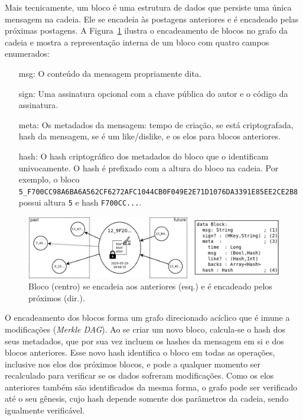 \documentclass[12pt]{article}
\begin{document}
Mais tecnicamente, um bloco é uma estrutura de dados que persiste uma única
mensagem na cadeia.
Ele se encadeia às postagens anteriores e é encadeado pelas próximas postagens.
A Figura~\ref{fig.block} ilustra o encadeamento de blocos no grafo da cadeia e
mostra a representação interna de um bloco com quatro campos enumerados:
%
\begin{enumerate}
\item[msg:]  O conteúdo da mensagem propriamente dita.
\item[sign:] Uma assinatura opcional com a chave pública do autor e o código da
             assinatura.
\item[meta:] Os metadados da mensagem: tempo de criação, se está criptografada,
             hash da mensagem, se é um like/dislike, e os elos para blocos
             anteriores.
\item[hash:] O hash criptográfico dos metadados do bloco que o identificam
             univocamente. O hash é prefixado com a altura do bloco na cadeia.
             Por exemplo, o bloco
                {\scriptsize\texttt{5\_F700CC98A6BA6A562CF6272AFC1044CB0F049E2E71D1076DA3391E85EE2CE2B8}}
             possui altura \texttt{5} e hash \texttt{F700CC...}.
\end{enumerate}

\begin{figure}[ht]
\centering
\includegraphics[width=.90\textwidth]{block1.png}
\caption{\scriptsize{Bloco (centro) se encadeia aos anteriores (esq.) e é encadeado
         pelos próximos (dir.).}}
\label{fig.block}
\end{figure}

O encadeamento dos blocos forma um grafo direcionado acíclico que é imune a
modificações (\emph{Merkle DAG}).
Ao se criar um novo bloco, calcula-se o hash dos seus metadados, que por sua
vez incluem os hashes da mensagem em si e dos blocos anteriores.
Esse novo hash identifica o bloco em todas as operações, inclusive nos elos dos
próximos blocos, e pode a qualquer momento ser recalculado para verificar se os
dados sofreram modificações.
Como os elos anteriores também são identificados da mesma forma, o grafo pode
ser verificado até o seu gênesis, cujo hash depende somente dos parâmetros da
cadeia, sendo igualmente verificável.
\end{document}
